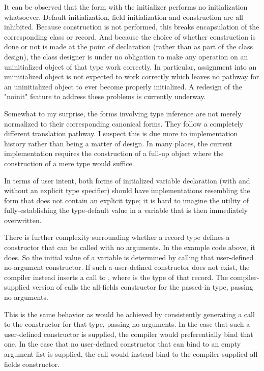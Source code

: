 It can be observed that the form with the  initializer performs no
initialization whatsoever.  Default-initialization, field initialization and construction are
all inhibited.  Because construction is not performed, this breaks encapsulation of the
corresponding class or record.  And because the choice of whether construction is done or
not is made at the point of declaration (rather than as part of the class design), the
class designer is under no obligation to make any operation on an uninitialized object of
that type work correctly.  In particular, assignment into an uninitialized object is
not expected to work correctly which leaves no pathway for an uninitialized
object to ever become properly initialized.  A redesign of the "noinit" feature to address
these problems is currently underway.

Somewhat to my surprise, the forms involving type inference are not merely normalized
to their corresponding canonical forms.  They follow a completely different translation
pathway.  I suspect this is due more to implementation history rather than being a matter
of design.  In many places, the current implementation requires the construction of a
full-up object where the construction of a mere type would suffice.  

In terms of user intent, both forms of initialized variable declaration (with and without
an explicit type specifier) should have implementations resembling the
form that does not contain an explicit type; it is hard to imagine the utility of
fully-establishing the type-default value in a variable that is then immediately overwritten.

There is further complexity surrounding whether a record type defines a constructor that
can be called with no arguments.  In the example code above, it does.  So the initial value of
a  variable is determined by calling that user-defined no-argument
constructor.  If such a user-defined constructor does not exist, the compiler instead
inserts a call to , where  is the type of that record.  The
compiler-supplied version of  calls the all-fields constructor for the
passed-in type, passing no arguments.  

This is the same behavior as would be achieved by consistently generating a call to the
constructor for that type, passing no arguments.  
In the case that such a user-defined
constructor is supplied, the compiler would preferentially bind that one.
In the case that no user-defined
constructor that can bind to an empty argument list is supplied, the call would instead bind to
the compiler-supplied all-fields constructor.  


